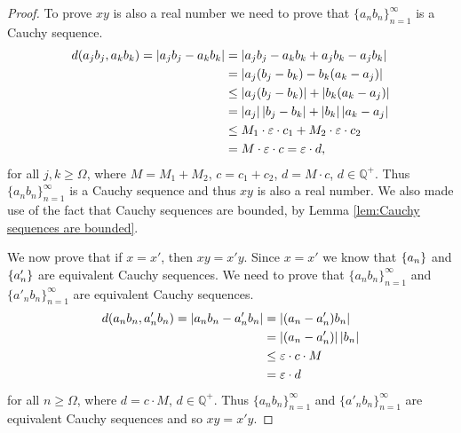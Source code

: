 {

\begin{proof}
    To prove $xy$ is also a real number we need to prove that $\{a_nb_n\}_{n=1}^{\infty}$ is a Cauchy sequence. 
    \begin{align*}
        d(a_jb_j, a_kb_k)= \left\lvert a_jb_j-a_kb_k \right\rvert& = \left\lvert a_jb_j-a_kb_k+a_jb_k-a_jb_k \right\rvert \\
        & =\left\lvert a_j(b_j-b_k)-b_k(a_k-a_j) \right\rvert \\
        & \leq \left\lvert a_j(b_j-b_k) \right\rvert+\left\lvert b_k(a_k-a_j) \right\rvert \\
        & = \left\lvert a_j \right\rvert\left\lvert b_j-b_k \right\rvert + \left\lvert b_k \right\rvert\left\lvert a_k-a_j \right\rvert \\
        & \leq M_1 \cdot \varepsilon \cdot c_1 + M_2 \cdot \varepsilon \cdot c_2 \\
        & = M \cdot \varepsilon \cdot c = \varepsilon \cdot d,
    \end{align*}
    for all $j,k \geq \Omega$, where $M=M_1+M_2$, $c=c_1+c_2$, $d=M \cdot c$, $d \in \mathbb{Q}^+$. Thus $\{a_nb_n\}_{n=1}^{\infty}$ is a Cauchy sequence and thus $xy$ is also a real number. We also made use of the fact that Cauchy sequences are bounded, by Lemma \ref{lem:Cauchy sequences are bounded}.

    We now prove that if $x=x'$, then $xy=x'y$. Since $x=x'$ we know that $\{a_n\}$ and $\{a'_n\}$ are equivalent Cauchy sequences. We need to prove that $\{a_nb_n\}_{n=1}^{\infty}$ and $\{a'_nb_n\}_{n=1}^{\infty}$ are equivalent Cauchy sequences. 
    \begin{align*}
        d(a_nb_n, a'_nb_n)=\left\lvert a_nb_n - a'_nb_n \right\rvert & = \left\lvert (a_n-a'_n)b_n \right\rvert \\
        & = \left\lvert (a_n-a'_n) \right\rvert \left\lvert b_n \right\rvert \\
        & \leq  \varepsilon \cdot c \cdot M \\
        & = \varepsilon \cdot d
    \end{align*}
    for all $n \geq \Omega$, where $d=c \cdot M$, $d \in \mathbb{Q}^+$. Thus $\{a_nb_n\}_{n=1}^{\infty}$ and $\{a'_nb_n\}_{n=1}^{\infty}$ are equivalent Cauchy sequences and so $xy=x'y$.
\end{proof}

}
